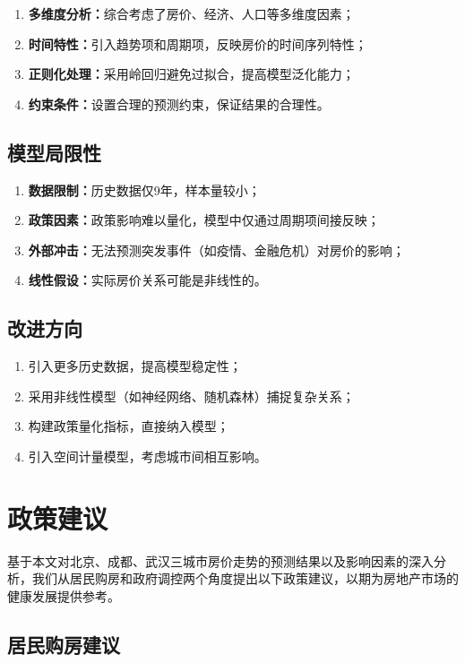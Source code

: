 \documentclass[12pt,a4paper]{article}
\begin{document}
\begin{enumerate}
    \item \textbf{多维度分析：}综合考虑了房价、经济、人口等多维度因素；
    \item \textbf{时间特性：}引入趋势项和周期项，反映房价的时间序列特性；
    \item \textbf{正则化处理：}采用岭回归避免过拟合，提高模型泛化能力；
    \item \textbf{约束条件：}设置合理的预测约束，保证结果的合理性。
\end{enumerate}

\subsection{模型局限性}

\begin{enumerate}
    \item \textbf{数据限制：}历史数据仅9年，样本量较小；
    \item \textbf{政策因素：}政策影响难以量化，模型中仅通过周期项间接反映；
    \item \textbf{外部冲击：}无法预测突发事件（如疫情、金融危机）对房价的影响；
    \item \textbf{线性假设：}实际房价关系可能是非线性的。
\end{enumerate}

\subsection{改进方向}

\begin{enumerate}
    \item 引入更多历史数据，提高模型稳定性；
    \item 采用非线性模型（如神经网络、随机森林）捕捉复杂关系；
    \item 构建政策量化指标，直接纳入模型；
    \item 引入空间计量模型，考虑城市间相互影响。
\end{enumerate}

\section{政策建议}

基于本文对北京、成都、武汉三城市房价走势的预测结果以及影响因素的深入分析，我们从居民购房和政府调控两个角度提出以下政策建议，以期为房地产市场的健康发展提供参考。

\subsection{居民购房建议}
\end{document}
